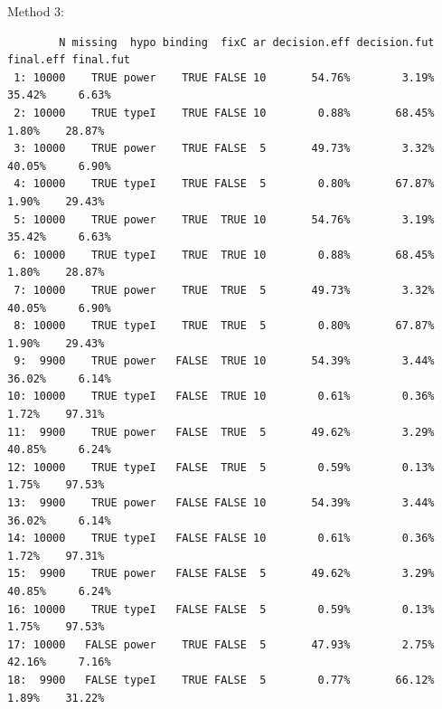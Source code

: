 \documentclass[12pt]{article}
\begin{document}
Method 3:
\begin{verbatim}
        N missing  hypo binding  fixC ar decision.eff decision.fut final.eff final.fut
 1: 10000    TRUE power    TRUE FALSE 10       54.76%        3.19%    35.42%     6.63%
 2: 10000    TRUE typeI    TRUE FALSE 10        0.88%       68.45%     1.80%    28.87%
 3: 10000    TRUE power    TRUE FALSE  5       49.73%        3.32%    40.05%     6.90%
 4: 10000    TRUE typeI    TRUE FALSE  5        0.80%       67.87%     1.90%    29.43%
 5: 10000    TRUE power    TRUE  TRUE 10       54.76%        3.19%    35.42%     6.63%
 6: 10000    TRUE typeI    TRUE  TRUE 10        0.88%       68.45%     1.80%    28.87%
 7: 10000    TRUE power    TRUE  TRUE  5       49.73%        3.32%    40.05%     6.90%
 8: 10000    TRUE typeI    TRUE  TRUE  5        0.80%       67.87%     1.90%    29.43%
 9:  9900    TRUE power   FALSE  TRUE 10       54.39%        3.44%    36.02%     6.14%
10: 10000    TRUE typeI   FALSE  TRUE 10        0.61%        0.36%     1.72%    97.31%
11:  9900    TRUE power   FALSE  TRUE  5       49.62%        3.29%    40.85%     6.24%
12: 10000    TRUE typeI   FALSE  TRUE  5        0.59%        0.13%     1.75%    97.53%
13:  9900    TRUE power   FALSE FALSE 10       54.39%        3.44%    36.02%     6.14%
14: 10000    TRUE typeI   FALSE FALSE 10        0.61%        0.36%     1.72%    97.31%
15:  9900    TRUE power   FALSE FALSE  5       49.62%        3.29%    40.85%     6.24%
16: 10000    TRUE typeI   FALSE FALSE  5        0.59%        0.13%     1.75%    97.53%
17: 10000   FALSE power    TRUE FALSE  5       47.93%        2.75%    42.16%     7.16%
18:  9900   FALSE typeI    TRUE FALSE  5        0.77%       66.12%     1.89%    31.22%
\end{verbatim}

\clearpage
\end{document}
